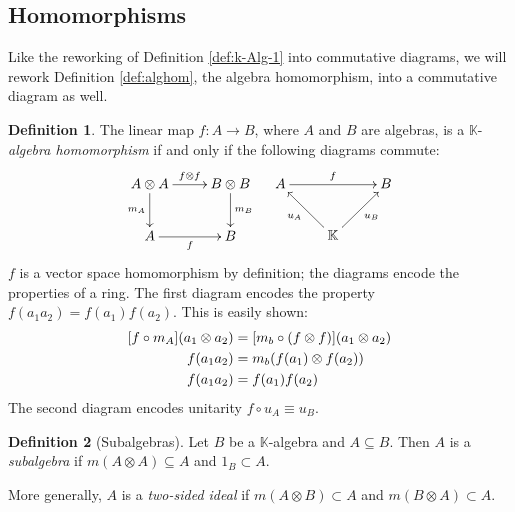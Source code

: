 \documentclass[svgnames]{article}
\theoremstyle{definition}
\newtheorem{Definition}{Definition}
\theoremstyle{remark}
\theoremstyle{underline}
\theoremstyle{underline}
\begin{document}
	\subsection{Homomorphisms}
	Like the reworking of Definition \ref{def:k-Alg-1} into commutative diagrams, we will rework Definition \ref{def:alghom}, the algebra homomorphism, into a commutative diagram as well.

	\begin{Definition}
		The linear map $f\colon A \to B$, where $A$ and $B$ are algebras, is a $\mathbb K$-\emph{algebra homomorphism} if and only if the following diagrams commute:
		\begin{align*}
			\xymatrix{
				A \otimes A \ar[r]^-{f \otimes f} \ar[d]_-{m_A} & B \otimes B \ar[d]^-{m_B}  \\
				A  \ar[r]_-{f} & B
			} & & 
			\xymatrix{
				A \ar[rr]^-{f} & & B \\
				& \mathbb K \ar[lu]^-{u_{A}} \ar[ru]_-{u_B} & 
			}
		\end{align*}
		$f$ is a vector space homomorphism by definition; the diagrams encode the properties of a ring. The first diagram encodes the property $f(a_1 a_2) = f(a_1)f(a_2)$. This is easily shown:
		\begin{align*}
			 \bqty{f\circ m_A}\pqty{a_1 \otimes a_2} & = \bqty{m_b \circ (f \otimes f)}\pqty{a_1 \otimes a_2} \\
			 f\pqty{a_1 a_2} & = m_b\pqty{f(a_1) \otimes f(a_2)} \\
			 f\pqty{a_1 a_2} & = f(a_1)f(a_2) 
		\end{align*}
		The second diagram encodes unitarity $f \circ u_A \equiv u_B$.
	\end{Definition}
	
	\begin{Definition}[Subalgebras]
		Let $B$ be a $\mathbb K$-algebra and $A \subseteq B$. Then $A$ is a \emph{subalgebra} if $m(A \otimes A) \subseteq A$ and $1_{B} \subset A$.
	\end{Definition}
	More generally, $A$ is a \emph{two-sided ideal} if $m(A \otimes B) \subset A$ and $m(B \otimes A) \subset A$. 
\end{document}
